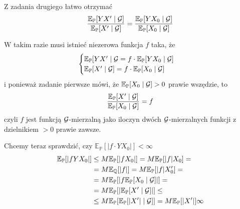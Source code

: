 \documentclass{article}
\newcommand{\E}{\mathbb{E}}
\renewcommand{\P}{\mathbb{P}}
\begin{document}
Z zadania drugiego łatwo otrzymać
$$\frac{\E_{\P}[YX'\;|\;\set{G}]}{\E_{\P}[X'\;|\;\set{G}]}=\frac{\E_{\P}[YX_0\;|\;\set{G}]}{\E_{\P}[X_0\;|\;\set{G}]}$$

W takim razie musi istnieć niezerowa funkcja $f$ taka, że
$$\begin{cases}{\E_{\P}[YX'\;|\;\set{G}}={f\cdot\E_{\P}[YX_0\;|\;\set{G}]}\\
{\E_{\P}[X'\;|\;\set{G}]}={f\cdot\E_{\P}[X_0\;|\;\set{G}]}\end{cases}$$
i ponieważ zadanie pierwsze mówi, że $\E_{\P}[X_0\;|\;\set{G}]>0$ prawie wszędzie, to
$$\frac{\E_{\P}[X'\;|\;\set{G}]}{\E_{\P}[X_0\;|\;\set{G}]}=f$$
czyli $f$ jest funkcją $\mathcal{G}$-mierzalną jako iloczyn dwóch $\mathcal{G}$-mierzalnych funkcji z dzielnikiem $>0$ prawie zawsze.

Chcemy teraz sprawdzić, czy $\E_{\P}[|f\cdot YX_0|]<\infty$
\begin{align*}
  \E_{\P}[|fYX_0|]&\leq M\E_{\P}[|fX_0|]=M\E_{\P}[|f|X_0]=\\ 
                  &=M\E_{\Q}[|f|]=M\E_{\P}[|f|X_0']=\\ 
                  &=M\E_{\P}[|f\E_{\P}[X_0\;|\;\set{G}]|]=\\ 
                  &=M\E_{\P}[|\E_{\P}[X'\;|\;\set{G}]|]\leq \\ 
                  &\leq M\E_{\P}[\E_{\P}[|X'|\;|\;\set{G}]]=M\E_{\P}[|X'|]\infty
\end{align*}

\end{document}

